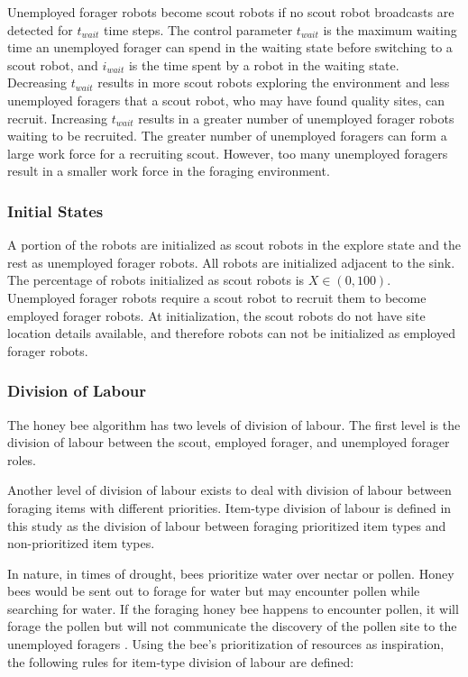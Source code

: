 \documentclass[preprint,12pt]{elsarticle}
\begin{document}
Unemployed forager robots become scout robots if no scout robot broadcasts are detected for $t_{wait}$ time steps. The control parameter $t_{wait}$ is the maximum waiting time an unemployed forager can spend in the waiting state before switching to a scout robot, and $i_{wait}$ is the time spent by a robot in the waiting state. Decreasing $t_{wait}$ results in more scout robots exploring the environment and less unemployed foragers that a scout robot, who may have found quality sites, can recruit. Increasing $t_{wait}$ results in a greater number of unemployed forager robots waiting to be recruited. The greater number of unemployed foragers can form a large work force for a recruiting scout. However, too many unemployed foragers result in a smaller work force in the foraging environment.

\subsubsection{Initial States}
\label{initialstates}

A portion of the robots are initialized as scout robots in the explore state and the rest as unemployed forager robots. All robots are initialized adjacent to the sink. The percentage of robots initialized as scout robots is $X\in(0,100)$. Unemployed forager robots require a scout robot to recruit them to become employed forager robots. At initialization, the scout robots do not have site location details available, and therefore robots can not be initialized as employed forager robots. 

\subsubsection{Division of Labour}
\label{natureinspired:divisionoflabour}
The honey bee algorithm has two levels of division of labour. The first level is the division of labour between the scout, employed forager, and unemployed forager roles.

Another level of division of labour exists to deal with division of labour between foraging items with different priorities. Item-type division of labour is defined in this study as the division of labour between foraging prioritized item types and non-prioritized item types.

In nature, in times of drought, bees prioritize water over nectar or pollen. Honey bees would be sent out to forage for water but may encounter pollen while searching for water. If the foraging honey bee happens to encounter pollen, it will forage the pollen but will not communicate the discovery of the pollen site to the unemployed foragers \cite{seeley2009wisdom}. Using the bee's prioritization of resources as inspiration, the following rules for item-type division of labour are defined:
\end{document}
